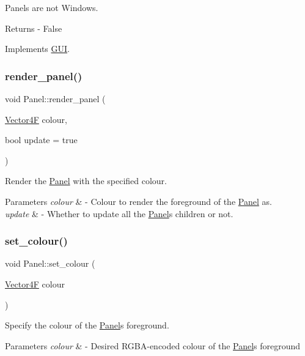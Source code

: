 Panels are not Windows. \begin{DoxyReturn}{Returns}
-\/ False 
\end{DoxyReturn}


Implements \mbox{\hyperlink{class_g_u_i_a7ef5287aaa630a8d1146f0d5a35b6683}{G\+UI}}.

\mbox{\label{class_panel_a9f81e58fd5b3d441a145d3aa5e222293}} 
\subsubsection{\texorpdfstring{render\+\_\+panel()}{render\_panel()}}
{\footnotesize\ttfamily void Panel\+::render\+\_\+panel (\begin{DoxyParamCaption}\item[{\mbox{\hyperlink{class_vector4}{Vector4F}}}]{colour,  }\item[{bool}]{update = {\ttfamily true} }\end{DoxyParamCaption})\hspace{0.3cm}{\ttfamily [protected]}}

Render the \mbox{\hyperlink{class_panel}{Panel}} with the specified colour. 
\begin{DoxyParams}{Parameters}
{\em colour} & -\/ Colour to render the foreground of the \mbox{\hyperlink{class_panel}{Panel}} as. \\
\hline
{\em update} & -\/ Whether to update all the \mbox{\hyperlink{class_panel}{Panel}}\textquotesingle{}s children or not. \\
\hline
\end{DoxyParams}
\mbox{\label{class_panel_af23b45cbf03066f1a1d884486ca00712}} 
\subsubsection{\texorpdfstring{set\+\_\+colour()}{set\_colour()}}
{\footnotesize\ttfamily void Panel\+::set\+\_\+colour (\begin{DoxyParamCaption}\item[{\mbox{\hyperlink{class_vector4}{Vector4F}}}]{colour }\end{DoxyParamCaption})}

Specify the colour of the \mbox{\hyperlink{class_panel}{Panel}}\textquotesingle{}s foreground. 
\begin{DoxyParams}{Parameters}
{\em colour} & -\/ Desired R\+G\+B\+A-\/encoded colour of the \mbox{\hyperlink{class_panel}{Panel}}\textquotesingle{}s foreground \\
\hline
\end{DoxyParams}
\mbox{\label{class_panel_aecd67bfb730ba8e0afd331b5c25c0e83}} 
